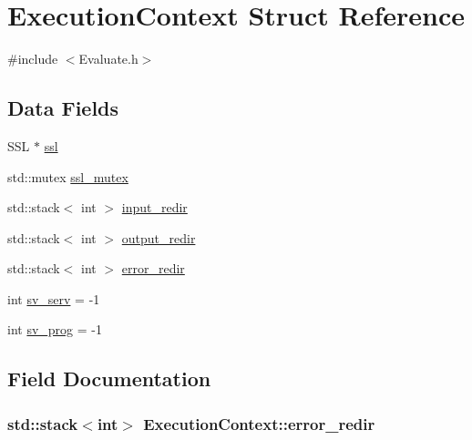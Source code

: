 \hypertarget{structExecutionContext}{}\section{Execution\+Context Struct Reference}
\label{structExecutionContext}


{\ttfamily \#include $<$Evaluate.\+h$>$}

\subsection*{Data Fields}
\begin{DoxyCompactItemize}
\item 
S\+SL $\ast$ \hyperlink{structExecutionContext_a4e07d3987bc1e56f59a36e6363520406}{ssl}
\item 
std\+::mutex \hyperlink{structExecutionContext_a241cad372197f9880a9af9e93ecd7633}{ssl\+\_\+mutex}
\item 
std\+::stack$<$ int $>$ \hyperlink{structExecutionContext_acd35d0f46c9747f2a429b455bc5ed60d}{input\+\_\+redir}
\item 
std\+::stack$<$ int $>$ \hyperlink{structExecutionContext_a3954dde282360db1e3016c3663d78ff5}{output\+\_\+redir}
\item 
std\+::stack$<$ int $>$ \hyperlink{structExecutionContext_afde89ad28dc8efe79737ccc45cba7ab4}{error\+\_\+redir}
\item 
int \hyperlink{structExecutionContext_aac8fa1ea0b889137efab488cb650cca1}{sv\+\_\+serv} = -\/1
\item 
int \hyperlink{structExecutionContext_a14419dd2173223d2e30444ec9d484d92}{sv\+\_\+prog} = -\/1
\end{DoxyCompactItemize}


\subsection{Field Documentation}
\subsubsection[{\texorpdfstring{error\+\_\+redir}{error_redir}}]{\setlength{\rightskip}{0pt plus 5cm}std\+::stack$<$int$>$ Execution\+Context\+::error\+\_\+redir}\hypertarget{structExecutionContext_afde89ad28dc8efe79737ccc45cba7ab4}{}\label{structExecutionContext_afde89ad28dc8efe79737ccc45cba7ab4}
